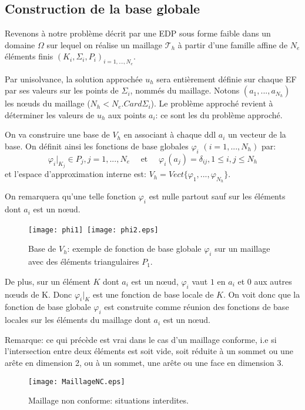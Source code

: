 \medskip
\subsection{Construction de la base globale}

Revenons à notre problème décrit par une EDP sous forme faible dans un domaine
$\Omega$ sur lequel on réalise un maillage $\mathcal{T}_h$ à partir d'une famille affine
de $N_e$ éléments finis $(K_i, \Sigma_i, P_i)_{i=1,...,N_e}$.

\medskip
Par unisolvance, la solution approchée $u_h$ sera entièrement définie sur chaque EF
par ses valeurs sur les points de $\Sigma_i$, nommés  du maillage. 
Notons $(a_1, ..., a_{N_h})$ les nœuds du maillage ($N_h<N_e . Card\Sigma_i$). 
Le problème approché revient à déterminer les valeurs de $u_h$ aux points $a_i$: 
ce sont les  du problème approché.

\medskip
On va construire une base de $V_h$ en associant à chaque ddl $a_i$ un vecteur de la base. 
On définit ainsi les fonctions de base globales $\varphi_i$ $(i = 1, ..., N_h)$ par:
\begin{equation}\varphi_i|_{K_j} \in P_j, j = 1, ..., N_e \quad \text{ et }\quad \varphi_i(a_j) = \delta_{ij}, 1\le i,j\le N_h\end{equation}
et l'espace d'approximation interne est: $V_h=Vect\{\varphi_1, ..., \varphi_{N_h}\}$.

On remarquera qu'une telle fonction $\varphi_i$ est nulle partout sauf sur les éléments
dont $a_i$ est un nœud.
\begin{figure}[ht]
 \begin{center}
  \texttt{[image: phi1]}~\texttt{[image: phi2.eps]}
 \end{center}
\caption{\label{BaseVh} Base de $V_h$: exemple de fonction de base globale $\varphi_i$ 
 sur un maillage avec des éléments triangulaires $P_1$.}
\end{figure}

\medskip
De plus, sur un élément $K$ dont $a_i$ est un nœud, $\varphi_i$ vaut $1$ en $a_i$ et 
$0$ aux autres nœuds de K. Donc $\varphi_i|_K$ est une fonction de base locale de $K$. 
On voit donc que la fonction de base globale $\varphi_i$ est construite comme réunion des 
fonctions de base locales sur les éléments du maillage dont $a_i$ est un nœud.

\medskip
Remarque: ce qui précède est vrai dans le cas d'un maillage conforme, i.e si
l'intersection entre deux éléments est soit vide, soit réduite à un
sommet ou une arête en dimension 2, ou à un sommet, une arête ou une face 
en dimension 3.
\begin{figure}[ht]
\begin{center}
\texttt{[image: MaillageNC.eps]}
\caption{\label{maillageNC} Maillage non conforme: situations interdites.}
\end{center}
\end{figure}











